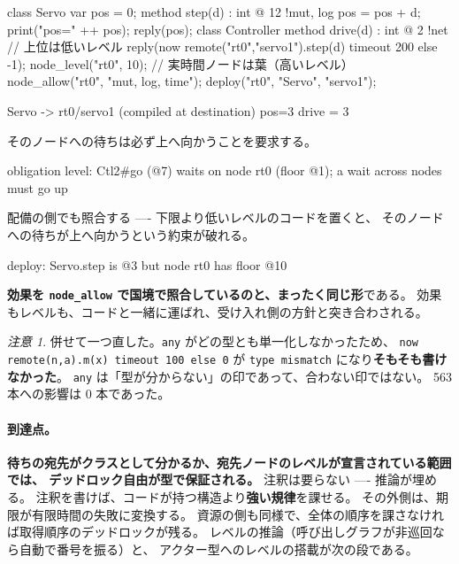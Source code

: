 \documentclass[11pt,a4paper]{ltjsarticle}
\theoremstyle{definition}
\theoremstyle{remark}
\newtheorem{remark}[theorem]{注意}
\begin{document}
\begin{aipl}
class Servo {
  var pos = 0;
  method step(d) : int @ 12 !{mut, log} { pos = pos + d; print("pos=" ++ pos); reply(pos); }
}
class Controller {
  method drive(d) : int @ 2 !{net} {          // 上位は低いレベル
    reply(now remote("rt0","servo1").step(d) timeout 200 else -1);
  }
}
node_level("rt0", 10);              // 実時間ノードは葉（高いレベル）
node_allow("rt0", "mut, log, time");
deploy("rt0", "Servo", "servo1");
\end{aipl}
\begin{term}
[deploy] Servo -> rt0/servo1 (compiled at destination)
pos=3
drive = 3
\end{term}

そのノードへの待ちは必ず上へ向かうことを要求する。

\begin{term}
 obligation level: Ctl2#go (@7) waits on node rt0 (floor @1);
             a wait across nodes must go up
\end{term}

配備の側でも照合する ---- 下限より低いレベルのコードを置くと、
そのノードへの待ちが上へ向かうという約束が破れる。

\begin{term}
deploy: Servo.step is @3 but node rt0 has floor @10
\end{term}

\textbf{効果を \texttt{node\_allow} で国境で照合しているのと、まったく同じ形}である。
効果もレベルも、コードと一緒に運ばれ、受け入れ側の方針と突き合わされる。

\begin{remark}
併せて一つ直した。\texttt{any} がどの型とも単一化しなかったため、
\texttt{now remote(n,a).m(x) timeout 100 else 0} が
\texttt{type mismatch} になり\textbf{そもそも書けなかった}。
\texttt{any} は「型が分からない」の印であって、合わない印ではない。
563 本への影響は 0 本であった。
\end{remark}

\paragraph{到達点。}
\textbf{待ちの宛先がクラスとして分かるか、宛先ノードのレベルが宣言されている範囲では、
デッドロック自由が型で保証される。}
注釈は要らない ---- 推論が埋める。
注釈を書けば、コードが持つ構造より\textbf{強い規律}を課せる。
その外側は、期限が有限時間の失敗に変換する。
資源の側も同様で、全体の順序を課さなければ取得順序のデッドロックが残る。
レベルの推論（呼び出しグラフが非巡回なら自動で番号を振る）と、
アクター型へのレベルの搭載が次の段である。
\end{document}
